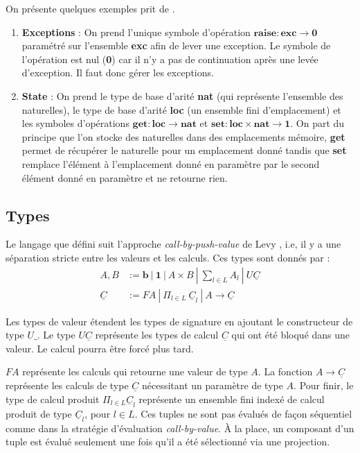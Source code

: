 	\begin{exemple}\label{exStateExc}
		On présente quelques exemples prit de \cite{DBLP:journals/tcs/HylandPP06}.
		\begin{enumerate}
			\item[]\textbf{Exceptions} : On prend l'unique symbole d'opération $\textbf{raise} : \textbf{exc} \rightarrow \textbf{0}$ paramétré sur l'ensemble \textbf{exc} afin de lever une exception. Le symbole de l'opération est nul (\textbf{0}) car il n'y a pas de continuation après une levée d'exception. Il faut donc gérer les exceptions.
			
			\item[]\textbf{State} : On prend le type de base d'arité \textbf{nat} (qui représente l'ensemble des naturelles), le type de base d'arité \textbf{loc} (un ensemble fini d'emplacement) et les symboles d'opérations $\textbf{get} : \textbf{loc} \rightarrow \textbf{nat}$ et $\textbf{set} : \textbf{loc} \times \textbf{nat} \rightarrow \textbf{1}$. On part du principe que l'on stocke des naturelles dans des emplacements mémoire, \textbf{get} permet de récupérer le naturelle pour un emplacement donné tandis que \textbf{set} remplace l'élément à l'emplacement donné en paramètre par le second élément donné en paramètre et ne retourne rien. 
		\end{enumerate}
	\end{exemple}

\subsection{Types}
	
	Le langage que défini suit l'approche \textit{call-by-push-value} de Levy \cite{DBLP:journals/lisp/Levy06}, i.e, il y a une séparation stricte entre les valeurs et les calculs. Ces types sont donnés par : 
	\begin{align*}
		A,B &:= \textbf{b}~|~\textbf{1}~|~A \times B~|~\sum_{l \in L} A_l~|~U\underline{C}\\
		\underline{C} &:= FA~|~\Pi_{l\in L}~\underline{C}_l~|~A \rightarrow\underline{C}
	\end{align*}
	
	Les types de valeur étendent les types de signature en ajoutant le constructeur de type $U\_$. Le type $U\underline{C}$ représente les types de calcul $\underline{C}$ qui ont été bloqué dans une valeur. Le calcul pourra être forcé plus tard.
	
	$FA$ représente les calculs qui retourne une valeur de type $A$. La fonction $A \rightarrow \underline{C}$ représente les calculs de type $\underline{C}$ nécessitant un paramètre de type $A$. Pour finir, le type de calcul produit $\Pi_{l\in L} \underline{C}_l$ représente un ensemble fini indexé de calcul produit de type $\underline{C}_l$, pour $l \in L$. Ces tuples ne sont pas évalués de façon séquentiel comme dans la stratégie d'évaluation \textit{call-by-value}. À la place, un composant d'un tuple est évalué seulement une fois qu'il a été sélectionné via une projection. 
	

